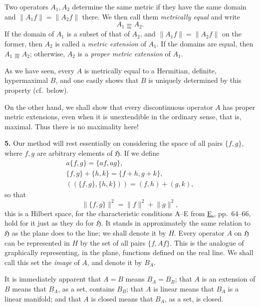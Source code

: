 \documentclass[fontsize=13pt,paper=b5,leqno,bookmarkpackage=false]{scrartcl}
\begin{document}
Two operators \(A_1,A_2\) determine the same metric if they have the
same domain and
\(\lVert A_1f\rVert=\lVert A_2f\rVert\) there. We then call them
\emph{metrically equal} and write
\[
  A_1\underset{m}{=}A_2.
\]
If the domain of \(A_1\) is a subset of that of \(A_2\), and
\(\lVert A_1f\rVert=\lVert A_2f\rVert\) on the former, then \(A_2\) is
called a \emph{metric extension} of \(A_1\). If the domains are equal,
then \(A_1\underset{m}{=}A_2\); otherwise, \(A_2\) is a \emph{proper
metric extension} of \(A_1\).

As we have seen, every \(A\) is metrically equal to a Hermitian,
definite, hypermaximal \(B\), and one easily shows that \(B\) is uniquely
determined by this property (cf.\ below).

On the other hand, we shall show that every discontinuous operator \(A\)
has proper metric extensions, even when it is unextendible in the
ordinary sense, that is, maximal. Thus there is no maximality here!

\label{intro:5}
\noindent\textbf{5.}
Our method will rest essentially on considering the space of all pairs
\(\{f,g\}\), where \(f,g\) are arbitrary elements of \(\mathfrak H\).
If we define
\label{eq:intro-pair-space}
\begin{equation*}
 \begin{gathered}
   a\{f,g\}=\{af,ag\},\\
   \{f,g\}+\{h,k\}=\{f+h,g+k\},\\
   \left(\!\left(\{f,g\},\{h,k\}\right)\!\right)
      =(f,h)+(g,k),
 \end{gathered}
\end{equation*}
so that
\[
  \lVert\{f,g\}\rVert^2=\lVert f\rVert^2+\lVert g\rVert^2,
\]
this is a Hilbert space, for the characteristic conditions A--E from
\hyperlink{bib:E}{E.}, pp.~64--66, hold for it just as they do for
\(\mathfrak H\). It
stands in approximately the same relation to \(\mathfrak H\) as the
plane does to the line; we shall denote it by \(H\). Every operator \(A\)
on \(\mathfrak H\) can be represented in \(H\) by the set of all pairs
\(\{f,Af\}\). This is the analogue of graphically representing, in the
plane, functions defined on the real line. We shall call this set the
\emph{image} of \(A\), and denote it by \(B_A\).

It is immediately apparent that \(A=B\) means \(B_A=B_B\); that \(A\)
is an extension of \(B\) means that \(B_A\), as a set, contains \(B_B\);
that \(A\) is linear means that \(B_A\) is a linear manifold; and that
\(A\) is closed means that \(B_A\), as a set, is closed.
\end{document}

